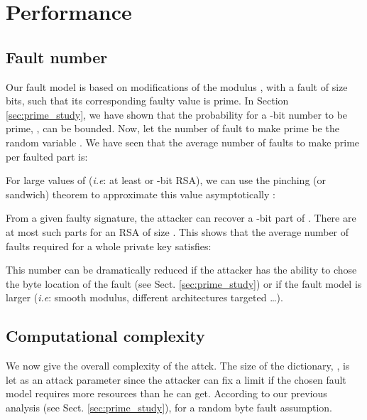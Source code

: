 \documentclass{article}
\begin{document}
\section{Performance}

\subsection{Fault number}
Our fault model is based on modifications of the modulus , with
a fault of size  bits, such that its corresponding faulty value is prime. 
In Section \ref{sec:prime_study}, we have shown that the probability
for a -bit number to be prime, , can be bounded. Now, let the
number of fault to make  prime be the random variable
. 
We have seen that the average number of faults to make  prime
per faulted part is:

For large values of  (\textit{i.e}: at least  or -bit
RSA), we can use the pinching (or sandwich) theorem to approximate
this value asymptotically :

From a given faulty signature, the attacker can recover a -bit part
of . There are at most  such parts for an RSA of size .
This shows that the average number of faults required for a whole
private key satisfies:

This number can be dramatically reduced if the attacker has the
ability to chose the byte location of the fault (see
Sect. \ref{sec:prime_study}) or if the fault model is larger
(\textit{i.e}: smooth modulus, different architectures targeted
\ldots).

\subsection{Computational complexity}


We now give the overall complexity of the attck. 
The size of the dictionary, , is let as an attack
parameter since the
attacker can fix a limit if the chosen fault model requires more
resources than he can get. 
According to our previous analysis (see Sect. \ref{sec:prime_study}),
 for a random byte fault assumption. 
\end{document}
